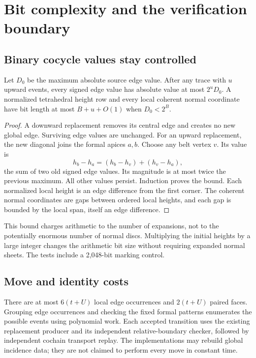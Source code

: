 \section{Bit complexity and the verification boundary}\label{sec:verification}

\subsection{Binary cocycle values stay controlled}

\begin{lemma}\label{lem:bits}
Let $D_0$ be the maximum absolute source edge value. After any trace with
$u$ upward events, every signed edge value has absolute value at most
$2^uD_0$. A normalized tetrahedral height row and every local coherent
normal coordinate have bit length at most $B+u+O(1)$ when $D_0<2^B$.
\end{lemma}
\begin{proof}
A downward replacement removes its central edge and creates no new global
edge. Surviving edge values are unchanged. For an upward replacement, the
new diagonal joins the formal apices $a,b$. Choose any belt vertex $v$.
Its value is
\[
 h_b-h_a=(h_b-h_v)+(h_v-h_a),
\]
the sum of two old signed edge values. Its magnitude is at most twice the
previous maximum. All other values persist. Induction proves the bound.
Each normalized local height is an edge difference from the first corner.
The coherent normal coordinates are gaps between ordered local heights,
and each gap is bounded by the local span, itself an edge difference.
\end{proof}

This bound charges arithmetic to the number of expansions, not to the
potentially enormous number of normal discs. Multiplying the initial heights
by a large integer changes the arithmetic bit size without requiring expanded
normal sheets. The tests include a 2,048-bit marking control.

\subsection{Move and identity costs}

There are at most $6(t+U)$ local edge occurrences and $2(t+U)$ paired faces.
Grouping edge occurrences and checking the fixed formal patterns enumerates
the possible events using polynomial work. Each accepted transition uses
the existing replacement producer and its independent relative-boundary
checker, followed by independent cochain transport replay. The implementations
may rebuild global incidence data; they are not claimed to perform every
move in constant time.

